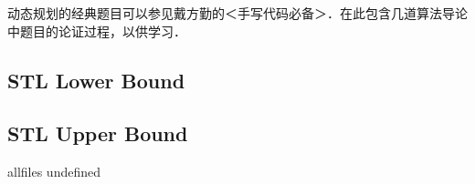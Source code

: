\documentclass[a4paper,10pt]{article}
\begin{document}
\begin{CJK}{UTF8}{gbsn}     %

\else

动态规划的经典题目可以参见戴方勤的＜手写代码必备＞．在此包含几道算法导论中题目的论证过程，以供学习．
\subsection{STL Lower Bound}

\subsection{STL Upper Bound}



\fi

\ifx allfiles undefined
\end{CJK}
\end{document}
